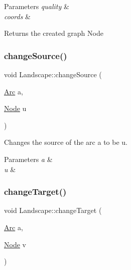 \begin{DoxyParams}{Parameters}
{\em quality} & \\
\hline
{\em coords} & \\
\hline
\end{DoxyParams}
\begin{DoxyReturn}{Returns}
the created graph Node 
\end{DoxyReturn}
\mbox{\label{class_landscape_ae176491eae8fec5777ab8566cc8bf64f}} 
\subsubsection{\texorpdfstring{change\+Source()}{changeSource()}}
{\footnotesize\ttfamily void Landscape\+::change\+Source (\begin{DoxyParamCaption}\item[{\hyperlink{classconcepts_1_1_abstract_landscape_a0966623f028fe50ac9a3ae114dcf2672}{Arc}}]{a,  }\item[{\hyperlink{classconcepts_1_1_abstract_landscape_a7c2f90fb9f42302f1af84a59f4df4b91}{Node}}]{u }\end{DoxyParamCaption})}



Changes the source of the arc a to be u. 


\begin{DoxyParams}{Parameters}
{\em a} & \\
\hline
{\em u} & \\
\hline
\end{DoxyParams}
\mbox{\label{class_landscape_a4bbe12577926a357f715d8e91c393ec4}} 
\subsubsection{\texorpdfstring{change\+Target()}{changeTarget()}}
{\footnotesize\ttfamily void Landscape\+::change\+Target (\begin{DoxyParamCaption}\item[{\hyperlink{classconcepts_1_1_abstract_landscape_a0966623f028fe50ac9a3ae114dcf2672}{Arc}}]{a,  }\item[{\hyperlink{classconcepts_1_1_abstract_landscape_a7c2f90fb9f42302f1af84a59f4df4b91}{Node}}]{v }\end{DoxyParamCaption})}



